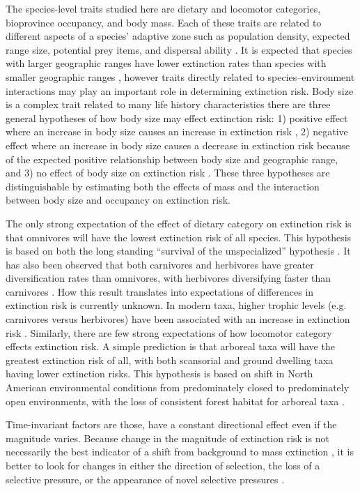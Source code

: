 \documentclass[12pt]{article}
\begin{document}
The species-level traits studied here are dietary and locomotor categories, bioprovince occupancy, and body mass. Each of these traits are related to different aspects of a species' adaptive zone such as population density, expected range size, potential prey items, and dispersal ability \cite{Smith2004,Jernvall2004}. It is expected that species with larger geographic ranges have lower extinction rates than species with smaller geographic ranges \cite{Jablonski1986,Roy2009c}, however traits directly related to species--environment interactions may play an important role in determining extinction risk. Body size is a complex trait related to many life history characteristics there are three general hypotheses of how body size may effect extinction risk: 1) positive effect where an increase in body size causes an increase in extinction risk \cite{Liow2008,Liow2009}, 2) negative effect where an increase in body size causes a decrease in extinction risk because of the expected positive relationship between body size and geographic range, and 3) no effect of body size on extinction risk \cite{Tomiya2013}. These three hypotheses are distinguishable by estimating both the effects of mass and the interaction between body size and occupancy on extinction risk.

The only strong expectation of the effect of dietary category on extinction risk is that omnivores will have the lowest extinction risk of all species. This hypothesis is based on both the long standing ``survival of the unspecialized'' hypothesis \cite{Liow2004a,Simpson1944}. It has also been observed that both carnivores and herbivores have greater diversification rates than omnivores, with herbivores diversifying faster than carnivores \cite{Price2012}. How this result translates into expectations of differences in extinction risk is currently unknown. In modern taxa, higher trophic levels (e.g. carnivores versus herbivores) have been associated with an increase in extinction risk \cite{Liow2009,Fritz2009,Purvis2000a}. Similarly, there are few strong expectations of how locomotor category effects extinction risk. A simple prediction is that arboreal taxa will have the greatest extinction risk of all, with both scansorial and ground dwelling taxa having lower extinction risks. This hypothesis is based on shift in North American environmental conditions from predominately closed to predominately open environments, with the loss of consistent forest habitat for arboreal taxa \cite{Blois2009,Janis1993a}. 

Time-invariant factors are those, have a constant directional effect even if the magnitude varies. Because change in the magnitude of extinction risk is not necessarily the best indicator of a shift from background to mass extinction \cite{Wang2003}, it is better to look for changes in either the direction of selection, the loss of a selective pressure, or the appearance of novel selective pressures \cite{Jablonski1986}.
\end{document}
